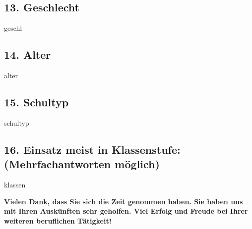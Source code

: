 \documentclass[a4paper,10pt]{article}
\begin{document}
{\subsection*{13. Geschlecht}
\vspace{0.5cm}
\begin{questionmult}{geschl}
	\begin{choiceshoriz}
	\end{choiceshoriz}
\end{questionmult}

\subsection*{14. Alter}
\vspace{0.5cm}
\begin{questionmult}{alter}
	\begin{choices}
	\end{choices}
\end{questionmult}

\subsection*{15. Schultyp}
\vspace{0.5cm}
\begin{questionmult}{schultyp}
	\begin{choices}
		\scoring{b=1}
		\scoring{b=2}
		\scoring{b=3}
		\scoring{b=4}
		\scoring{b=5}
		\scoring{b=6}
	\end{choices}
\end{questionmult}

\subsection*{16. Einsatz meist in Klassenstufe: \\ (Mehrfachantworten möglich)}
\vspace{0.5cm}
\begin{questionmult}{klassen}
	\begin{choices}
	\end{choices}
\end{questionmult}



\bigskip

\begin{flushleft}
\textbf{Vielen Dank, dass Sie sich die Zeit genommen haben. Sie haben uns mit Ihren Auskünften sehr geholfen. Viel Erfolg und Freude bei Ihrer weiteren beruflichen Tätigkeit!}
\end{flushleft}

\newpage
\quad  %


}
\end{document}
